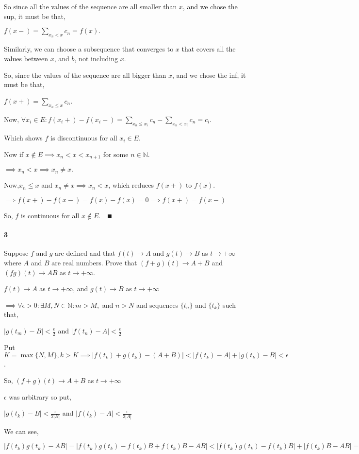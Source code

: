 \documentclass{article}
\newcommand\N{\mathbb{N}}
\begin{document}
So since all the values of the sequence are all smaller than $x$, and
we chose the sup, it must be that,

$f(x-) = \sum_{x_n < x} c_n = f(x).$

Similarly, we can choose a subsequence that converges to $x$ that covers
all the values between $x$, and $b$, not including $x$.

So, since the values of the sequence are all bigger than $x$, and we
chose the inf, it must be that,

$f(x+) = \sum_{x_n \leq x} c_n$.

Now, $\forall x_i \in E: f(x_i+) - f(x_i-) = \sum_{x_n \leq x_i} c_n -
\sum_{x_n < x_i} c_n = c_i$.

Which shows $f$ is discontinuous for all $x_i\in E$.

Now if $x\not\in E \implies x_n < x <x_{n+1}$ for some $n\in\N.$

$\implies x_n < x \implies x_n \neq x.$

Now,$x_n\leq x$ and $x_n\neq x \implies x_n < x$, which reduces
$f(x+)$ to $f(x)$.

$\implies f(x+)-f(x-) = f(x) - f(x) = 0 \implies f(x+) = f(x-)$

So, $f$ is continuous for all $x\not\in E. \quad ∎$
\newpage
\paragraph{3} Suppose $f$ and $g$ are defined and that $f(t)→ A$ and
$g(t)→ B$ as $t → +∞$ where $A$ and $B$
are real numbers. Prove that $(f + g)(t) → A + B$ and $(f g)(t) → AB$
as $t → +∞$.

 $f(t)→ A$ as $t → +∞$, and $g(t)→ B$ as $t → +∞$

$\implies \forall \epsilon>0: \exists M,N\in\N: m>M,$ and $n> N$ and
sequences $\{t_n\}$ and $\{t_k\}$ such that,


$|g(t_m) - B |<\frac{\epsilon}{2}$ and $|f(t_n)-A| <
\frac{\epsilon}{2}$

Put $K = \max\{N,M\}, k>K \implies |f(t_k) +g(t_k) -(A + B)| <
|f(t_k)-A| +|g(t_k)-B| < \epsilon$.

So, $(f+g)(t) \rightarrow A+B$ as
$t\rightarrow +\infty$

$\epsilon$ was arbitrary so put,

$|g(t_k) - B |<\frac{\epsilon}{2|B|}$ and $|f(t_k)-A| <
\frac{\epsilon}{2|A|}$

We can see,

$|f(t_k)g(t_k) - AB|= |f(t_k)g(t_k) -f(t_k) B +f(t_k) B - AB| <
|f(t_k)g(t_k) -f(t_k)B |+|f(t_k) B - AB| = |f(t_k)(g(t_k)-B)|
+|B(f(t_k)-A)|=  |f(t_k)||g(t_k)-B|
+|B||f(t_k)-A|\leq |f(t_k)|\frac{\epsilon}{2|A|} +|B|\frac{\epsilon}{2|B|}$
\end{document}
